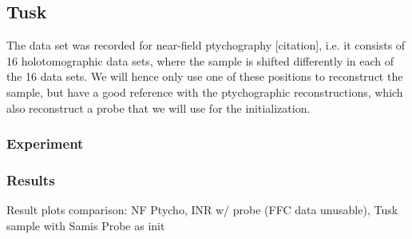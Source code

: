 \subsection{Tusk} \label{subsec:tusk}
The data set was recorded for near-field ptychography [citation], i.e. it consists of 16 holotomographic data sets, where the sample is shifted differently in each of the 16 data sets.
We will hence only use one of these positions to reconstruct the sample, but have a good reference with the ptychographic reconstructions, which also reconstruct a probe that we will use for the initialization.

\subsubsection{Experiment} \label{subsubsec:tusk_experiment}

\subsubsection{Results} \label{subsubsec:tusk_results}

Result plots comparison: NF Ptycho, INR w/ probe (FFC data unusable), Tusk sample with Samis Probe as init

